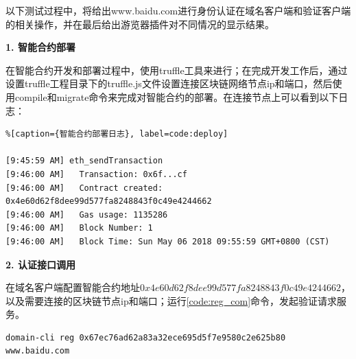 以下测试过程中，将给出www.baidu.com进行身份认证在域名客户端和验证客户端的相关操作，并在最后给出游览器插件对不同情况的显示结果。


\noindent\textbf{1. 智能合约部署}

在智能合约开发和部署过程中，使用truffle工具来进行；在完成开发工作后，通过设置truffle工程目录下的truffle.js文件设置连接区块链网络节点ip和端口，然后使用compile和migrate命令来完成对智能合约的部署。在连接节点上可以看到以下日志：

\begin{lstlisting}%[caption={智能合约部署日志}, label=code:deploy]

[9:45:59 AM] eth_sendTransaction
[9:46:00 AM]   Transaction: 0x6f...cf
[9:46:00 AM]   Contract created: 0x4e60d62f8dee99d577fa8248843f0c49e4244662
[9:46:00 AM]   Gas usage: 1135286
[9:46:00 AM]   Block Number: 1
[9:46:00 AM]   Block Time: Sun May 06 2018 09:55:59 GMT+0800 (CST)

\end{lstlisting}

\noindent\textbf{2. 认证接口调用}

在域名客户端配置智能合约地址$0x4e60d62f8dee99d577fa8248843f0c49e4244662$，以及需要连接的区块链节点ip和端口；运行\ref{code:reg_com}命令，发起验证请求服务。

\begin{lstlisting}[caption={认证请求命令}, label={code:reg_com}]
domain-cli reg 0x67ec76ad62a83a32ece695d5f7e9580c2e625b80 www.baidu.com
\end{lstlisting}




